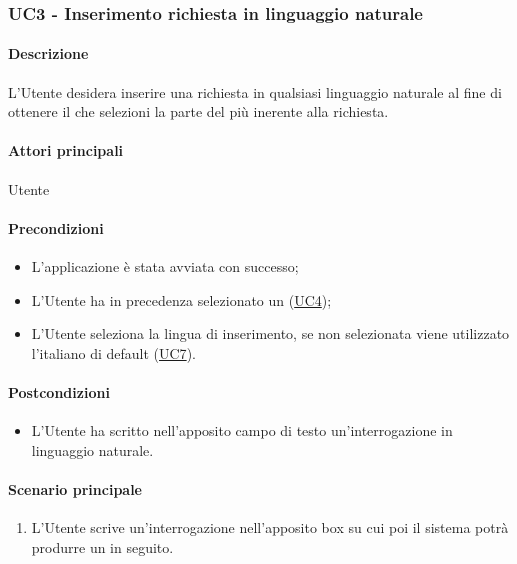 \subsubsection{UC3 - Inserimento richiesta in linguaggio naturale}\label{UC3}
\paragraph*{Descrizione}
L’Utente desidera inserire una richiesta in qualsiasi linguaggio naturale al fine di ottenere il  che selezioni la parte del  più inerente alla richiesta. 

\paragraph*{Attori principali}
Utente

\paragraph*{Precondizioni}
\begin{itemize}
  \item L'applicazione è stata avviata con successo;
  \item L’Utente ha in precedenza selezionato un  (\hyperref[UC4]{UC4}); 
  \item L'Utente seleziona la lingua di inserimento, se non selezionata viene utilizzato l'italiano di default (\hyperref[UC7]{UC7}).
\end{itemize}

\paragraph*{Postcondizioni}
\begin{itemize}
  \item L’Utente ha scritto nell’apposito campo di testo un'interrogazione in linguaggio naturale.
\end{itemize}

\paragraph*{Scenario principale}
\begin{enumerate}
  \item L’Utente scrive un'interrogazione nell’apposito box su cui poi il sistema potrà produrre un  in seguito.
\end{enumerate}
